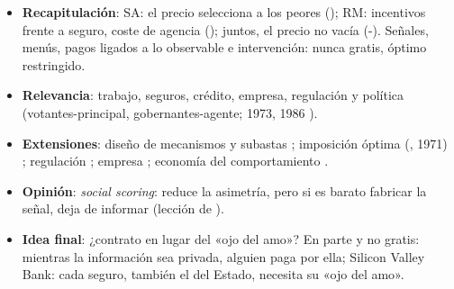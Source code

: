\documentclass{article}
\begin{document}
\begin{columnas}
\begin{itemize}
\item \textbf{Recapitulación}: SA: el precio selecciona a los peores (); RM: incentivos frente a seguro, coste de agencia (); juntos, el precio no vacía (-). Señales, menús, pagos ligados a lo observable e intervención: nunca gratis, óptimo restringido.
\item \textbf{Relevancia}: trabajo, seguros, crédito, empresa, regulación y política (votantes-principal, gobernantes-agente;  1973,  1986 ).
\item \textbf{Extensiones}: diseño de mecanismos y subastas ; imposición óptima (, 1971) ; regulación ; empresa ; economía del comportamiento .
\item \textbf{Opinión}: \emph{social scoring}: reduce la asimetría, pero si es barato fabricar la señal, deja de informar (lección de ).
\item \textbf{Idea final}: ¿contrato en lugar del «ojo del amo»? En parte y no gratis: mientras la información sea privada, alguien paga por ella; Silicon Valley Bank: cada seguro, también el del Estado, necesita su «ojo del amo».
\end{itemize}


\end{columnas}
\end{document}
